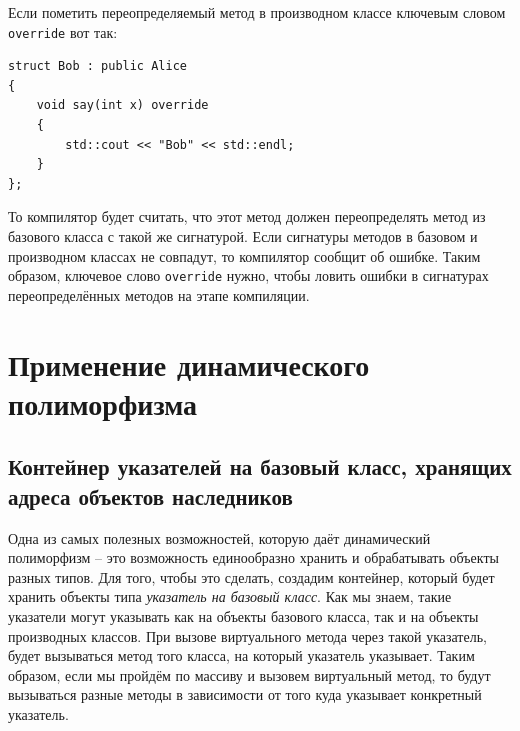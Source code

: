 \documentclass{article}
\begin{document}
Если пометить переопределяемый метод в производном классе ключевым словом \texttt{override} вот так:
\begin{lstlisting}[style=csMiptCppBorderStyle]
struct Bob : public Alice 
{
    void say(int x) override
    {
    	std::cout << "Bob" << std::endl;
    }
};
\end{lstlisting}
То компилятор будет считать, что этот метод должен переопределять метод из базового класса с такой же сигнатурой. Если сигнатуры методов в базовом и производном классах не совпадут, то компилятор сообщит об ошибке. Таким образом, ключевое слово \texttt{override} нужно, чтобы ловить ошибки в сигнатурах переопределённых методов на этапе компиляции.



\newpage
\section{Применение динамического полиморфизма}

\subsection*{Контейнер указателей на базовый класс, хранящих адреса объектов наследников}
Одна из самых полезных возможностей, которую даёт динамический полиморфизм -- это возможность единообразно хранить и обрабатывать объекты разных типов. Для того, чтобы это сделать, создадим контейнер, который будет хранить объекты типа \textit{указатель на базовый класс}. Как мы знаем, такие указатели могут указывать как на объекты базового класса, так и на объекты производных классов. При вызове виртуального метода через такой указатель, будет вызываться метод того класса, на который указатель указывает. Таким образом, если мы пройдём по массиву и вызовем виртуальный метод, то будут вызываться разные методы в зависимости от того куда указывает конкретный указатель.
\end{document}
